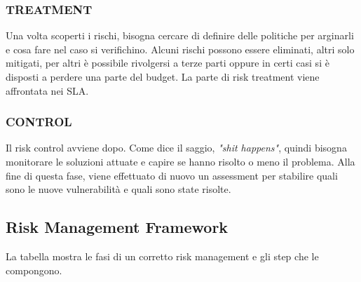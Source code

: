 \subsubsection{\textbf{TREATMENT}}
Una volta scoperti i rischi, bisogna cercare di definire delle politiche per arginarli e cosa fare nel caso si verifichino. Alcuni rischi possono essere eliminati, altri solo mitigati, per altri è possibile rivolgersi a terze parti oppure in certi casi si è disposti a perdere una parte del budget. La parte di risk treatment viene affrontata nei SLA.

\subsubsection{\textbf{CONTROL}}
Il risk control avviene dopo. Come dice il saggio, \textit{"shit happens"}, quindi bisogna monitorare le soluzioni attuate e capire se hanno risolto o meno il problema. Alla fine di questa fase, viene effettuato di nuovo un assessment per stabilire quali sono le nuove vulnerabilità e quali sono state risolte.
\clearpage

\subsection{Risk Management Framework}
La tabella mostra le fasi di un corretto risk management e gli step che le compongono.




